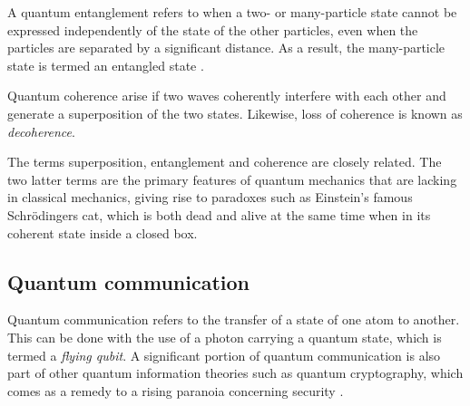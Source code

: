 A quantum entanglement refers to when a two- or many-particle state cannot be expressed independently of the state of the other particles, even when the particles are separated by a significant distance. As a result, the many-particle state is termed an entangled state \cite{Griffiths2017}.

Quantum coherence arise if two waves coherently interfere with each other and generate a superposition of the two states. Likewise, loss of coherence is known as \textit{decoherence}.

The terms superposition, entanglement and coherence are closely related. The two latter terms are the primary features of quantum mechanics that are lacking in classical mechanics, giving rise to paradoxes such as Einstein's famous Schrödingers cat, which is both dead and alive at the same time when in its coherent state inside a closed box.

\subsection{Quantum communication}

Quantum communication refers to the transfer of a state of one atom to another. This can be done with the use of a photon carrying a quantum state, which is termed a \textit{flying qubit}. A significant portion of quantum communication is also part of other quantum information theories such as quantum cryptography, which comes as a remedy to a rising paranoia concerning security \cite{Griffiths2002, Pavicic2006}.


